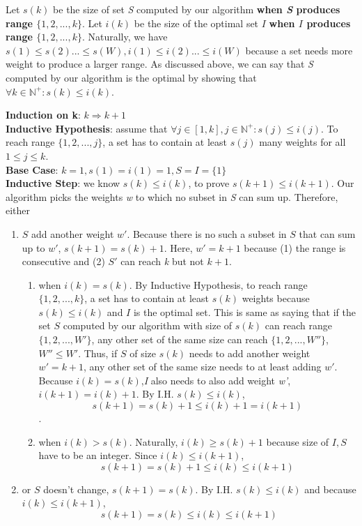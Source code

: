 \documentclass{article}
\begin{document}
        Let $s(k)$ be the size of set \textit{S} computed by our algorithm \textbf{when \textit{S} produces range $\{1,2,...,k\}$}. Let $i(k)$ be the size of the optimal set $I$ \textbf{when $I$ produces range $\{1,2,...,k\}$}. Naturally, we have $s(1)\leq s(2)...\leq s(W), i(1)\leq i(2)...\leq i(W)$ because a set needs more weight to produce a larger range. As discussed above, we can say that \textit{S} computed by our algorithm is the optimal by showing that $\forall k\in \mathbb{N}^{+}: s(k) \leq i(k)$.
        
            \textbf{Induction on k}: $k\Rightarrow k+1$\\
             \textbf{Inductive Hypothesis}: assume that $\forall j\in [1,k], j\in \mathbb{N}^{+}: s(j)\leq i(j)$. To reach range $\{1,2,...,j\}$, a set has to contain at least $s(j)$ many weights for all $1\leq j \leq k$.\\
            \textbf{Base Case}: $k = 1, s(1)=i(1)=1, S=I=\{1\}$\\
            \textbf{Inductive Step}: we know $s(k)\leq i(k)$, to prove $s(k+1)\leq i(k+1)$. Our algorithm picks the weights \textit{w} to which no subset in \textit{S} can sum up. Therefore, either \begin{enumerate}
                \item $S$ add another weight $w'$. Because there is no such a subset in $S$ that can sum up to $w'$, $s(k+1) = s(k) + 1$. Here, $w' = k+1$ because (1) the range is consecutive and (2) $S'$ can reach \textit{k} but not $k+1$.
                \begin{enumerate}
                    \item when $i(k) = s(k)$.  By Inductive Hypothesis, to reach range $\{1,2,...,k\}$, a set has to contain at least $s(k)$ weights because $s(k)\leq i(k)$ and $I$ is the optimal set. This is same as saying that if the set $S$ computed by our algorithm with size of $s(k)$ can reach range $\{1,2,...,W'\}$, any other set of the same size can reach $\{1,2,...,W''\}$, $W''\leq W'$. 
                    Thus, if $S$ of size $s(k)$ needs to add another weight $w'=k+1$, any other set of the same size needs to at least adding $w'$. Because $i(k)=s(k)$,\textit{I} also needs to also add weight \textit{w'}, $i(k+1) = i(k)+1$. By I.H. $s(k)\leq i(k)$, 
                    \[s(k+1)=s(k)+1\leq i(k)+1=i(k+1)\].
                    
                    \item when $i(k) > s(k)$. Naturally, $i(k) \geq s(k) + 1$ because size of $I, S$ have to be an integer. Since $i(k) \leq i(k+1)$, \[s(k+1)=s(k)+1\leq i(k)\leq i(k+1)\]
                    
                \end{enumerate}
                \item or $S$ doesn't change, $s(k+1) = s(k)$. By I.H. $s(k)\leq i(k)$ and because $i(k)\leq i(k+1)$, \[s(k+1) = s(k) \leq i(k) \leq i(k+1)\]
            \end{enumerate}
\end{document}
